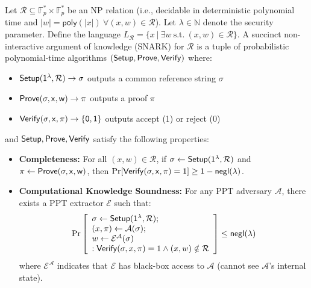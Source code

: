 \begin{definition}\label{def:snark}
    \noindent Let $\mathcal{R} \subseteq \mathbb{F}_p^{*} \times \mathbb{F}_p^{*}$ be an NP relation (i.e., decidable in deterministic polynomial time and $|w| = \mathsf{poly}(|x|)\ \forall (x, w) \in \mathcal{R}$). Let $\lambda \in \mathbb{N}$ denote the security parameter. Define the language $L_\mathcal{R} = \{x\ |\ \exists w\ \text{s.t.}\ (x, w) \in \mathcal{R}\}$. A succinct non-interactive argument of knowledge (SNARK) for $\mathcal{R}$ is a tuple of probabilistic polynomial-time algorithms $(\sf{Setup}, \sf{Prove}, \sf{Verify})$ where:
\begin{itemize}
    \item $\sf{Setup}(1^{\lambda}, \mathcal{R}) \rightarrow \sigma$ outputs a common reference string $\sigma$
    \item $\sf{Prove}(\sigma, x, w) \rightarrow \pi$ outputs a proof $\pi$
    \item $\sf{Verify}(\sigma, x, \pi) \rightarrow \{0, 1\}$ outputs accept (1) or reject (0)
\end{itemize}

\noindent and $\sf{Setup}, \sf{Prove}, \sf{Verify}$ satisfy the following properties:
\begin{itemize}
    \item \textbf{Completeness:} For all $(x, w) \in \mathcal{R}$, if $\sigma \leftarrow \sf{Setup}(1^{\lambda}, \mathcal{R})$ and $\pi \leftarrow \sf{Prove}(\sigma, x, w)$, then $\Pr[\sf{Verify}(\sigma, x, \pi) = 1] \geq 1 - \mathsf{negl}(\lambda)$.
    
    \item \textbf{Computational Knowledge Soundness:} For any PPT adversary $\mathcal{A}$, there exists a PPT extractor $\mathcal{E}$ such that:
    \begin{align*}
    \Pr\left[\begin{array}{l}
    \sigma \leftarrow \sf{Setup}(1^{\lambda}, \mathcal{R}); \\
    (x, \pi) \leftarrow \mathcal{A}(\sigma); \\
    w \leftarrow \mathcal{E}^{\mathcal{A}}(\sigma) \\
    : \mathsf{Verify}(\sigma, x, \pi) = 1 \land (x, w) \notin \mathcal{R}
    \end{array}\right] \leq \mathsf{negl}(\lambda)
    \end{align*}
        where $\mathcal{E}^{\mathcal{A}}$ indicates that $\mathcal{E}$ has black-box access to $\mathcal{A}$ (cannot see $\mathcal{A}$'s internal state).
    

\end{itemize}
\end{definition}
